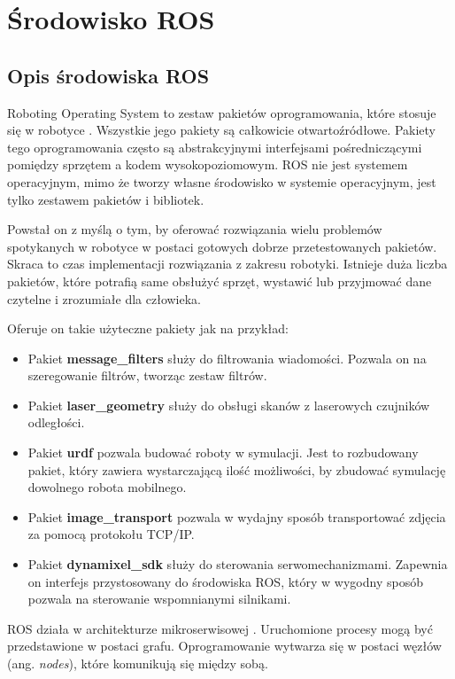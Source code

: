 \newpage
\section{Środowisko ROS}
{
    \subsection{Opis środowiska ROS}
    {
        Roboting Operating System to zestaw pakietów oprogramowania, które stosuje się w robotyce \cite{ros}. Wszystkie jego pakiety są całkowicie otwartoźródłowe. Pakiety tego oprogramowania często są abstrakcyjnymi interfejsami pośredniczącymi pomiędzy sprzętem a kodem wysokopoziomowym. ROS nie jest systemem operacyjnym, mimo że tworzy własne środowisko w systemie operacyjnym, jest tylko zestawem pakietów i bibliotek.

        Powstał on z myślą o tym, by oferować rozwiązania wielu problemów spotykanych w robotyce  w postaci gotowych dobrze przetestowanych pakietów. Skraca to czas implementacji rozwiązania z zakresu robotyki. Istnieje duża liczba pakietów, które potrafią same obsłużyć sprzęt, wystawić lub przyjmować dane czytelne i zrozumiałe dla człowieka.
        
        Oferuje on takie użyteczne pakiety jak na przykład:
        \begin{itemize}
            \item Pakiet \textbf{message\_filters} służy do filtrowania wiadomości. Pozwala on na szeregowanie filtrów, tworząc zestaw filtrów.
            \item Pakiet \textbf{laser\_geometry} służy do obsługi skanów z laserowych czujników odległości.
            \item Pakiet \textbf{urdf} pozwala budować roboty w symulacji. Jest to rozbudowany pakiet, który zawiera wystarczającą ilość możliwości, by zbudować symulację dowolnego robota mobilnego.
            \item Pakiet \textbf{image\_transport} pozwala w wydajny sposób transportować zdjęcia za pomocą protokołu TCP/IP.
            \item Pakiet \textbf{dynamixel\_sdk} służy do sterowania serwomechanizmami. Zapewnia on interfejs przystosowany do środowiska ROS, który w wygodny sposób pozwala na sterowanie  wspomnianymi silnikami.
        \end{itemize}
        
        ROS działa w architekturze mikroserwisowej \cite{microservices}. Uruchomione procesy mogą być przedstawione w postaci grafu. Oprogramowanie wytwarza się w postaci węzłów (ang. \textit{nodes}), które komunikują się między sobą.
        
}}
